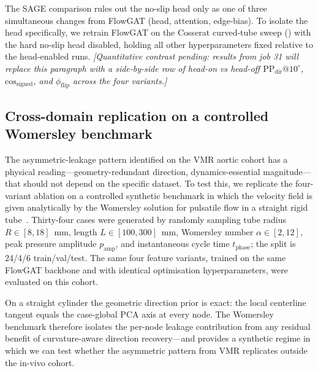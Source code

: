 \documentclass[10pt,a4paper]{article}
\makeatletter
\newcommand{\PPdir}[1]{\mathrm{PP_{dir}}@#1^\circ}
\newcommand{\cosgn}{\mathrm{cos}_\mathrm{signed}}
\newcommand{\fracflip}{\phi_\mathrm{flip}}
\makeatother
\begin{document}
The SAGE comparison rules out the no-slip head only as one of three
simultaneous changes from FlowGAT (head, attention, edge-bias). To
isolate the head specifically, we retrain FlowGAT on the Cosserat
curved-tube sweep () with the hard no-slip
head disabled, holding all other hyperparameters fixed relative to
the head-enabled runs. \textit{[Quantitative
contrast pending: results from job 31 will replace this paragraph
with a side-by-side row of head-on vs head-off
$\PPdir{10}$, $\cosgn$, and $\fracflip$ across the four variants.]}

\subsection*{Cross-domain replication on a controlled Womersley benchmark}
\label{sec:womersley}

The asymmetric-leakage pattern identified on the VMR aortic cohort has
a physical reading---geometry-redundant direction, dynamics-essential
magnitude---that should not depend on the specific dataset. To test
this, we replicate the four-variant ablation on a controlled synthetic
benchmark in which the velocity field is given analytically by the
Womersley solution for pulsatile flow in a straight rigid
tube~\cite{womersley1955}. Thirty-four cases were generated by
randomly sampling tube radius $R\in[8,18]$~mm, length $L\in[100,300]$~mm,
Womersley number $\alpha\in[2,12]$, peak pressure amplitude $p_\mathrm{amp}$,
and instantaneous cycle time $t_\mathrm{phase}$; the split is 24/4/6
train/val/test. The same four feature variants, trained on the same
FlowGAT backbone and with identical optimisation hyperparameters, were
evaluated on this cohort.

On a straight cylinder the geometric direction prior is exact: the
local centerline tangent equals the case-global PCA axis at every node.
The Womersley benchmark therefore isolates the per-node leakage
contribution from any residual benefit of curvature-aware direction
recovery---and provides a synthetic regime in which we can test whether
the asymmetric pattern from VMR replicates outside the in-vivo cohort.
\end{document}
